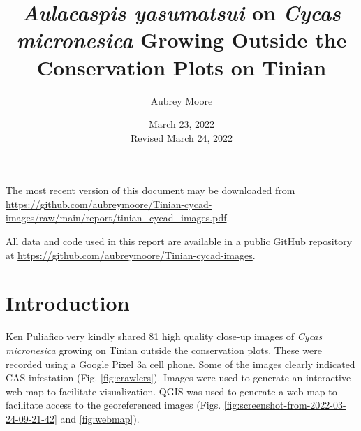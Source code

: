 \documentclass[12pt,letterpaper,english,bibliography=totocnumbered, abstract=on]{scrartcl}
\begin{document}
\titlehead{Technical Report}

\title{\textit{Aulacaspis yasumatsui} on \textit{Cycas micronesica} Growing Outside the Conservation Plots on Tinian}

\author{Aubrey Moore}

\date{March 23, 2022\\Revised March 24, 2022}

\maketitle
\newpage
\tableofcontents

\pagebreak

The most recent version of this document may be downloaded from \url{https://github.com/aubreymoore/Tinian-cycad-images/raw/main/report/tinian_cycad_images.pdf}.

All data and code used in this report are available in a public GitHub repository at
\url{https://github.com/aubreymoore/Tinian-cycad-images}.

\section{Introduction}

Ken Puliafico very kindly shared 81 high quality close-up images of \textit{Cycas micronesica} growing on Tinian outside the conservation plots. These were recorded using a Google Pixel 3a cell phone. Some of the images clearly indicated CAS infestation (Fig. \ref{fig:crawlers}). Images were used to generate an interactive web map to facilitate visualization. QGIS was used to generate a web map to facilitate access to the georeferenced images (Figs. \ref{fig:screenshot-from-2022-03-24-09-21-42} and \ref{fig:webmap}).
\end{document}
